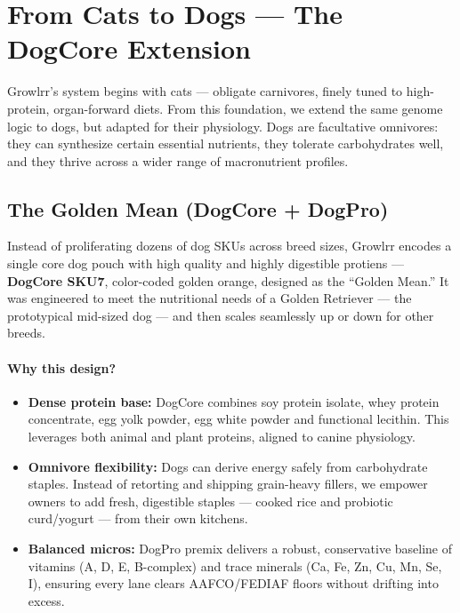 
\section*{From Cats to Dogs --- The DogCore Extension}

Growlrr's system begins with cats --- obligate carnivores, finely tuned to high-protein, organ-forward diets. From this foundation, we extend the same genome logic to dogs, but adapted for their physiology. Dogs are facultative omnivores\cite{ref2}: they can synthesize certain essential nutrients, they tolerate carbohydrates well, and they thrive across a wider range of macronutrient profiles.

\subsection*{The Golden Mean (DogCore + DogPro)}

Instead of proliferating dozens of dog SKUs across breed sizes, Growlrr encodes a single core dog pouch with high quality and highly digestible protiens --- \textbf{DogCore SKU7}, color-coded \colorbox{goldenorange}{\phantom{X}} golden orange, designed as the ``Golden Mean.'' It was engineered to meet the nutritional needs of a Golden Retriever --- the prototypical mid-sized dog --- and then scales seamlessly up or down for other breeds.

\paragraph{Why this design?}
\begin{itemize}[leftmargin=1.5em]
  \item \textbf{Dense protein base:} DogCore combines soy protein isolate, whey protein concentrate, egg yolk powder, egg white powder and functional lecithin. This leverages both animal and plant proteins, aligned to canine physiology.
  \item \textbf{Omnivore flexibility:} Dogs can derive energy safely from carbohydrate staples. Instead of retorting and shipping grain-heavy fillers, we empower owners to add fresh, digestible staples --- cooked rice and probiotic curd/yogurt --- from their own kitchens.
  \item \textbf{Balanced micros:} DogPro premix delivers a robust, conservative baseline of vitamins (A, D, E, B-complex) and trace minerals (Ca, Fe, Zn, Cu, Mn, Se, I), ensuring every lane clears AAFCO/FEDIAF floors without drifting into excess.
\end{itemize}

